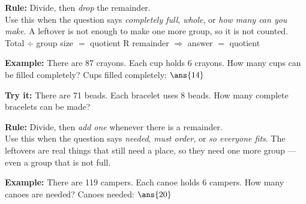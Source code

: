 \documentclass[12pt]{article}
\begin{document}


\begin{formulabox}
\textbf{Rule:} Divide, then \emph{drop} the remainder.\\[3pt]
Use this when the question says \emph{completely full}, \emph{whole}, or \emph{how many can you make}. A leftover is not enough to make one more group, so it is not counted.\\[3pt]
Total $\div$ group size $=$ quotient R remainder \quad $\Rightarrow$ \quad answer $=$ quotient
\end{formulabox}

\begin{examplebox}
\textbf{Example:} \quad There are 87 crayons. Each cup holds 6 crayons. How many cups can be filled completely?
Cups filled completely: $\ans{14}$
\end{examplebox}

\begin{tryitbox}
\textbf{Try it:} \quad There are 71 beads. Each bracelet uses 8 beads. How many complete bracelets can be made?\\[2pt]
\end{tryitbox}


\begin{formulabox}
\textbf{Rule:} Divide, then \emph{add one} whenever there is a remainder.\\[3pt]
Use this when the question says \emph{needed}, \emph{must order}, or \emph{so everyone fits}. The leftovers are real things that still need a place, so they need one more group --- even a group that is not full.
\end{formulabox}

\begin{examplebox}
\textbf{Example:} \quad There are 119 campers. Each canoe holds 6 campers. How many canoes are needed?
Canoes needed: $\ans{20}$
\end{examplebox}
\end{document}
